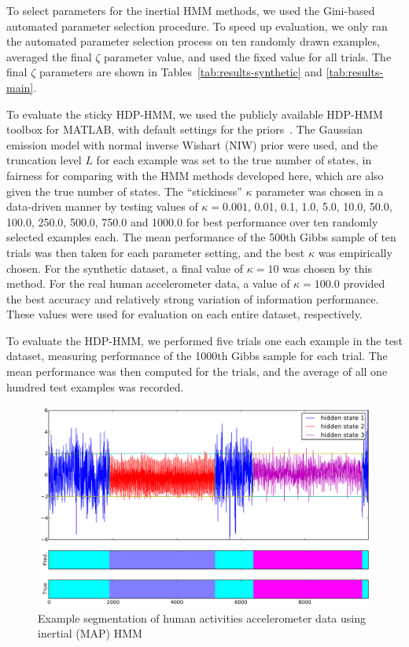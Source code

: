 \documentclass[letterpaper]{article}
\begin{document}
To select parameters for the inertial HMM methods, we used the Gini-based automated
parameter selection procedure. To speed up evaluation, we only 
ran the automated parameter selection process on ten randomly drawn examples, averaged 
the final $\zeta$ parameter value, and used the fixed value for all trials. The 
final $\zeta$ parameters are shown in Tables~\ref{tab:results-synthetic} and \ref{tab:results-main}.

To evaluate the sticky HDP-HMM, we used the publicly available HDP-HMM toolbox for MATLAB,
with default settings for the priors~\cite{HDP-HMM-TOOLKIT}. The Gaussian emission model with normal
inverse Wishart (NIW) prior were used, and the truncation level $L$ for each
example was set to the true number of states, in fairness for comparing with the
HMM methods developed here, which are also given the true number of states. The
``stickiness'' $\kappa$ parameter was chosen in a data-driven manner by testing
values of $\kappa=0.001$, 0.01, 0.1, 1.0, 5.0, 10.0, 50.0, 100.0, 250.0, 500.0,
750.0 and 1000.0 for best performance over ten randomly selected examples each.
The mean performance of the 500th Gibbs sample of ten trials was then taken for
each parameter setting, and the best $\kappa$ was empirically chosen. For the
synthetic dataset, a final value of $\kappa=10$ was chosen by this method. For
the real human accelerometer data, a value of $\kappa=100.0$ provided the best
accuracy and relatively strong variation of information performance. These
values were used for evaluation on each entire dataset, respectively.

To evaluate the HDP-HMM, we performed five trials one each example in the test
dataset, measuring performance of the 1000th Gibbs sample for each trial. The
mean performance was then computed for the trials, and the average of all one
hundred test examples was recorded.

\begin{figure}[htbp]
\setlength{\abovecaptionskip}{0pt}
\setlength{\belowcaptionskip}{0cm}
  \centering
    \includegraphics[width=1.0\linewidth]{images/real_segmentation_result.pdf}    
    \caption{\small{Example segmentation of human activities accelerometer data
    using inertial (MAP) HMM}}
    \label{fig:real-results-MAP}
\end{figure}
\end{document}
